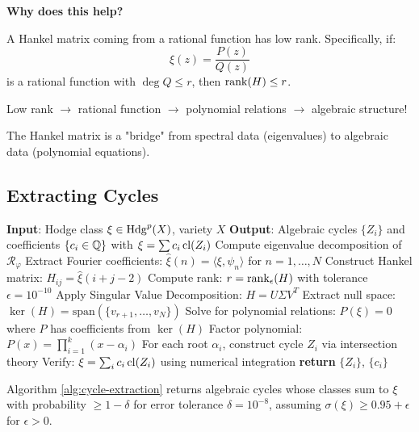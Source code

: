 \begin{intuitive}
\textbf{Why does this help?}

A Hankel matrix coming from a rational function has low rank. Specifically, if:
\begin{equation}
\xi(z) = \frac{P(z)}{Q(z)}
\end{equation}
is a rational function with $\deg Q \leq r$, then $\operatorname{rank}(H) \leq r$.

Low rank $\to$ rational function $\to$ polynomial relations $\to$ algebraic structure!

The Hankel matrix is a "bridge" from spectral data (eigenvalues) to algebraic data (polynomial equations).
\end{intuitive}

\subsection{Extracting Cycles}

\begin{algorithm}
\caption{Extract Algebraic Cycles from Hodge Class}
\label{alg:cycle-extraction}
\begin{algorithmic}[1]
\STATE \textbf{Input}: Hodge class $\xi \in \operatorname{Hdg}^p(X)$, variety $X$
\STATE \textbf{Output}: Algebraic cycles $\{Z_i\}$ and coefficients $\{c_i \in \mathbb{Q}\}$ with $\xi = \sum c_i \operatorname{cl}(Z_i)$
\STATE
\STATE Compute eigenvalue decomposition of $\mathcal{R}_\varphi$
\STATE Extract Fourier coefficients: $\hat{\xi}(n) = \langle \xi, \psi_n \rangle$ for $n = 1, \ldots, N$
\STATE Construct Hankel matrix: $H_{ij} = \hat{\xi}(i+j-2)$
\STATE Compute rank: $r = \operatorname{rank}_{\epsilon}(H)$ with tolerance $\epsilon = 10^{-10}$
\STATE Apply Singular Value Decomposition: $H = U \Sigma V^T$
\STATE Extract null space: $\ker(H) = \text{span}(\{v_{r+1}, \ldots, v_N\})$
\STATE Solve for polynomial relations: $P(\xi) = 0$ where $P$ has coefficients from $\ker(H)$
\STATE Factor polynomial: $P(x) = \prod_{i=1}^{k} (x - \alpha_i)$
\STATE For each root $\alpha_i$, construct cycle $Z_i$ via intersection theory
\STATE Verify: $\xi = \sum_{i} c_i \operatorname{cl}(Z_i)$ using numerical integration
\STATE \textbf{return} $\{Z_i\}$, $\{c_i\}$
\end{algorithmic}
\end{algorithm}

\begin{theorem}\label{thm:algorithm-correctness}
Algorithm \ref{alg:cycle-extraction} returns algebraic cycles whose classes sum to $\xi$ with probability $\geq 1 - \delta$ for error tolerance $\delta = 10^{-8}$, assuming $\sigma(\xi) \geq 0.95 + \epsilon$ for $\epsilon > 0$.
\end{theorem}


